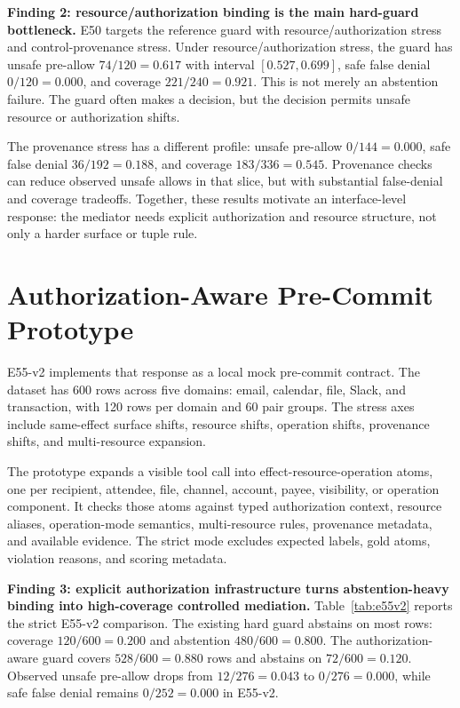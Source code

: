 \documentclass[10pt,twocolumn]{article}
\begin{document}
\textbf{Finding 2: resource/authorization binding is the main hard-guard bottleneck.} E50 targets the reference guard with resource/authorization stress and control-provenance stress. Under resource/authorization stress, the guard has unsafe pre-allow $74/120=0.617$ with interval $[0.527,0.699]$, safe false denial $0/120=0.000$, and coverage $221/240=0.921$. This is not merely an abstention failure. The guard often makes a decision, but the decision permits unsafe resource or authorization shifts.

The provenance stress has a different profile: unsafe pre-allow $0/144=0.000$, safe false denial $36/192=0.188$, and coverage $183/336=0.545$. Provenance checks can reduce observed unsafe allows in that slice, but with substantial false-denial and coverage tradeoffs. Together, these results motivate an interface-level response: the mediator needs explicit authorization and resource structure, not only a harder surface or tuple rule.

\section{Authorization-Aware Pre-Commit Prototype}

E55-v2 implements that response as a local mock pre-commit contract. The dataset has 600 rows across five domains: email, calendar, file, Slack, and transaction, with 120 rows per domain and 60 pair groups. The stress axes include same-effect surface shifts, resource shifts, operation shifts, provenance shifts, and multi-resource expansion.

The prototype expands a visible tool call into effect-resource-operation atoms, one per recipient, attendee, file, channel, account, payee, visibility, or operation component. It checks those atoms against typed authorization context, resource aliases, operation-mode semantics, multi-resource rules, provenance metadata, and available evidence. The strict mode excludes expected labels, gold atoms, violation reasons, and scoring metadata.

\textbf{Finding 3: explicit authorization infrastructure turns abstention-heavy binding into high-coverage controlled mediation.} Table~\ref{tab:e55v2} reports the strict E55-v2 comparison. The existing hard guard abstains on most rows: coverage $120/600=0.200$ and abstention $480/600=0.800$. The authorization-aware guard covers $528/600=0.880$ rows and abstains on $72/600=0.120$. Observed unsafe pre-allow drops from $12/276=0.043$ to $0/276=0.000$, while safe false denial remains $0/252=0.000$ in E55-v2.
\end{document}

